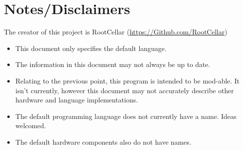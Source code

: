\documentclass[12pt]{article}
\begin{document}
\section{Notes/Disclaimers}

The creator of this project is RootCellar (\url{https://Github.com/RootCellar})

\begin{itemize}

\item
This document only specifies the default language.

\item
The information in this document may not always be up to date.

\item
Relating to the previous point, this program is intended to be mod-able.
It isn't currently, however this document may not accurately describe other hardware and
language implementations.

\item
The default programming language does not currently have a name. Ideas welcomed.

\item
The default hardware components also do not have names.

\end{itemize}
\end{document}
